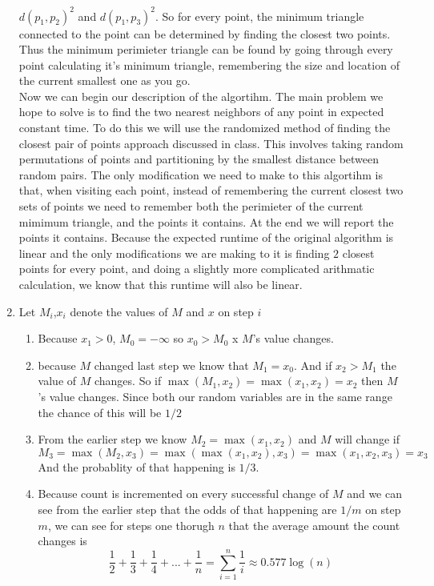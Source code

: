 \documentclass[11pt]{article}
\begin{document}
\begin{enumerate}
		$d(p_1,p_2)^2$  and $ d(p_1,p_3)^2 $.
		So for every point, the minimum triangle connected to the point
		can be determined by finding the closest two points. Thus the
		minimum perimieter triangle can be found by going through every
		point calculating it's minimum triangle, remembering the size and
		location of the current smallest one as you go.\\
		Now we can begin our description of the algortihm. The main
		problem we hope to solve is to find the two nearest neighbors of
		any point in expected constant time. To do this we will use the
		randomized method of finding the closest pair of points approach discussed in class.  This involves taking random permutations of points and partitioning by the smallest
		distance between random pairs. The only modification we need to make to this
		algortihm is that, when visiting each point, instead of remembering the
		current closest two sets of points we need to remember both
		the perimieter of the current mimimum triangle, and the points it
		contains. At the end we will report the points it contains.
		Because the expected runtime of the original algorithm is linear and the
		only modifications we are making to it is finding $2$
		closest points for every point, and doing a slightly more
		complicated arithmatic calculation, we know that this runtime
		will also be linear.

	\item 
		Let $M_i$,$x_i$ denote the values of $M$ and $x$ on step $i$
		\begin{enumerate}
		\item
			Because $x_1 > 0$, $M_0= - \infty $ so
			$x_0 > M_0$ x $M$'s value changes. 
		\item   because $M$ changed last step we know that $M_1 = x_0$.
			And if $x_2 > M_1 $ the value of $M$ changes.
			So if 
				$\max(M_1, x_2) = \max(x_1,x_2) = x_2$	
			then $M$'s value changes. Since both our random
			variables are in the same range the chance of this will be $1/2$
		\item From the earlier step we know $M_2 = \max(x_1,x_2)$ and
			$M$ will change if
			$$M_3 = \max(M_2,x_3) = \max(\max(x_1,x_2),x_3)
			= \max(x_1,x_2,x_3) = x_3$$
			And the probablity of that happening is $1/3$.
		\item Because count is incremented on every successful change of
			$M$ and we can see from the earlier step that the odds
				of that happening are $1/m$ on step $m$, we can
				see for steps one thorugh $n$ that the average amount
				the count changes is
			$$ \frac{1}{2}+ \frac{1}{3}+ \frac{1}{4} +...+
				\frac{1}{n} = \sum_{i = 1} ^ n \frac{1}{i}
				\approx 0.577 \log(n) $$


\end{enumerate}
\end{enumerate}
\end{document}
